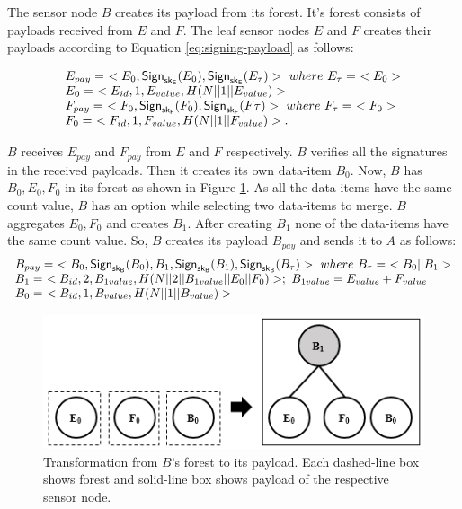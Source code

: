 	The sensor node $B$ creates its payload from its forest. 
	It's forest consists of payloads received from $E$ and $F$.
	The leaf sensor nodes $E$ and $F$ creates their payloads according to Equation \ref{eq:signing-payload} as follows:

	\begin{equation*}
		\begin{array}{l}
		E_{pay} =\ <E_{0}, \textsf{Sign}_{\sk_{E}}(E_{0}), \textsf{Sign}_{\sk_{E}}(E_{\tau}) >\ where\ E_{\tau} =\ <E_{0}>\\
		E_{0} =\ <E_{id}, 1, E_{value}, H(N||1||E_{value})>\\
		F_{pay} =\ <F_{0}, \textsf{Sign}_{\sk_{F}}(F_{0}), \textsf{Sign}_{\sk_{F}}(F{\tau}) >\ where\ F_{\tau} =\ <F_{0}>\\
		F_{0} =\ <F_{id}, 1, F_{value}, H(N||1||F_{value})>.
		\end{array}
	\end{equation*}
	
	$B$ receives $E_{pay}$ and $F_{pay}$ from $E$ and $F$ respectively. 
	$B$ verifies all the signatures in the received payloads.
	Then it creates its own data-item $B_{0}$.
	Now, $B$ has $B_{0},E_{0},F_{0}$ in its forest as shown in Figure \ref{fig:b-forest-payload}. 
	As all the data-items have the same count value, $B$ has an option while selecting two data-items to merge.
	$B$ aggregates $E_{0},F_{0}$ and creates $B_{1}$.
	After creating $B_{1}$ none of the data-items have the same count value. 
	So, $B$ creates its payload $B_{pay}$ and sends it to $A$ as follows:
	\begin{equation*}
		\begin{array}{l}
			B_{pay} =\ < B_{0}, \textsf{Sign}_{\sf{sk}_{B}}(B_{0}), B_{1}, \textsf{Sign}_{\sf{sk}_{B}}(B_{1}), \textsf{Sign}_{\sf{sk}_{B}}(B_{\tau}) >\ where\ B_{\tau} =\ <B_{0} || B_{1}>\\
			B_{1} =\ < B_{id}, 2, B_{1value}, H(N||2||B_{1value}||E_{0}||F_{0})>;\ B_{1value} = E_{value} + F_{value} \\
			B_{0} =\ <B_{id}, 1, B_{value}, H(N||1||B_{value})>
		\end{array}
		\label{eq:b-payload}
	\end{equation*}

	\begin{figure}[h!]
		\centering
		\includegraphics{images/b-forest-payload.png}
		\caption{Transformation from $B$'s forest to its payload.
				Each dashed-line box shows forest and solid-line box shows payload of the respective sensor node.}
		\label{fig:b-forest-payload}
	\end{figure}

